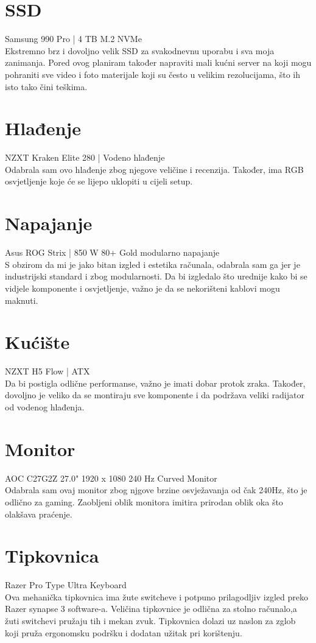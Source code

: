 \documentclass{report}
\begin{document}
\chapter{SSD}
Samsung 990 Pro | 4 TB M.2 NVMe
\\ Ekstremno brz i dovoljno velik SSD za svakodnevnu uporabu i sva moja zanimanja. Pored ovog planiram također napraviti mali kućni server na koji mogu pohraniti sve video i foto materijale koji su često u velikim rezolucijama, što ih isto tako čini teškima.

\chapter{Hlađenje}
NZXT Kraken Elite 280 | Vodeno hlađenje
\\ Odabrala sam ovo hlađenje zbog njegove veličine i recenzija. Također, ima RGB osvjetljenje koje će se lijepo uklopiti u cijeli setup.

\chapter{Napajanje}
Asus ROG Strix | 850 W 80+ Gold modularno napajanje
\\ S obzirom da mi je jako bitan izgled i estetika računala, odabrala sam ga jer je industrijski standard i zbog modularnosti. Da bi izgledalo što urednije kako bi se vidjele komponente i osvjetljenje, važno je da se nekorišteni kablovi mogu maknuti.

\chapter{Kućište}
NZXT H5 Flow | ATX
\\ Da bi postigla odlične performanse, važno je imati dobar protok zraka. Također, dovoljno je veliko da se montiraju sve komponente i da podržava veliki radijator od vodenog hlađenja.

\chapter{Monitor}
AOC C27G2Z 27.0" 1920 x 1080 240 Hz Curved Monitor
\\Odabrala sam ovaj monitor zbog njgove brzine osvježavanja od čak 240Hz, što je odlično za gaming. Zaobljeni oblik monitora imitira prirodan oblik oka što olakšava praćenje.

\chapter{Tipkovnica}
Razer Pro Type Ultra Keyboard
\\Ova mehanička tipkovnica ima žute switcheve i potpuno prilagodljiv izgled preko Razer synapse 3 software-a. Veličina tipkovnice je odlična za stolno računalo,a žuti switchevi pružaju tih i mekan zvuk. Tipkovnica dolazi uz naslon za zglob koji pruža ergonomsku podršku i dodatan užitak pri korištenju.
\end{document}
